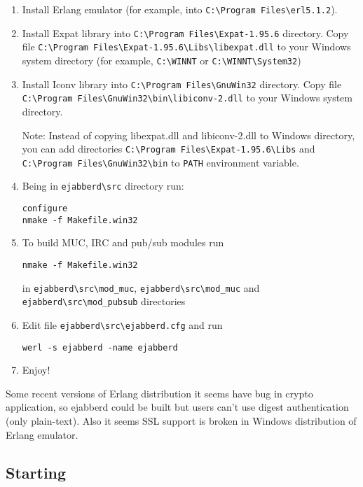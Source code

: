 \documentclass[10pt]{article}
\newcommand{\ejabberd}{\texttt{ejabberd}}
\begin{document}
\begin{enumerate}
\item Install Erlang emulator (for example, into \verb|C:\Program Files\erl5.1.2|).
\item Install Expat library into \verb|C:\Program Files\Expat-1.95.6|
  directory.  Copy file \verb|C:\Program Files\Expat-1.95.6\Libs\libexpat.dll|
  to your Windows system directory (for example, \verb|C:\WINNT| or
  \verb|C:\WINNT\System32|)
\item Install Iconv library into \verb|C:\Program Files\GnuWin32| directory.
  Copy file \verb|C:\Program Files\GnuWin32\bin\libiconv-2.dll| to your
  Windows system directory.
  
  Note: Instead of copying libexpat.dll and libiconv-2.dll to Windows
  directory, you can add directories
  \verb|C:\Program Files\Expat-1.95.6\Libs| and
  \verb|C:\Program Files\GnuWin32\bin| to \verb|PATH| environment
  variable.
\item Being in \verb|ejabberd\src| directory run:
\begin{verbatim}
configure
nmake -f Makefile.win32
\end{verbatim}
\item To build MUC, IRC and pub/sub modules run
\begin{verbatim}
nmake -f Makefile.win32
\end{verbatim}
  in \verb|ejabberd\src\mod_muc|, \verb|ejabberd\src\mod_muc| and
  \verb|ejabberd\src\mod_pubsub| directories
\item Edit file \verb|ejabberd\src\ejabberd.cfg| and run
\begin{verbatim}
werl -s ejabberd -name ejabberd
\end{verbatim}
\item Enjoy!
\end{enumerate}

Some recent versions of Erlang distribution it seems have bug in crypto
application, so ejabberd could be built but users can't use digest
authentication (only plain-text).  Also it seems SSL support is broken in
Windows distribution of Erlang emulator.






\subsection{Starting}
\label{sec:starting}
\end{document}
